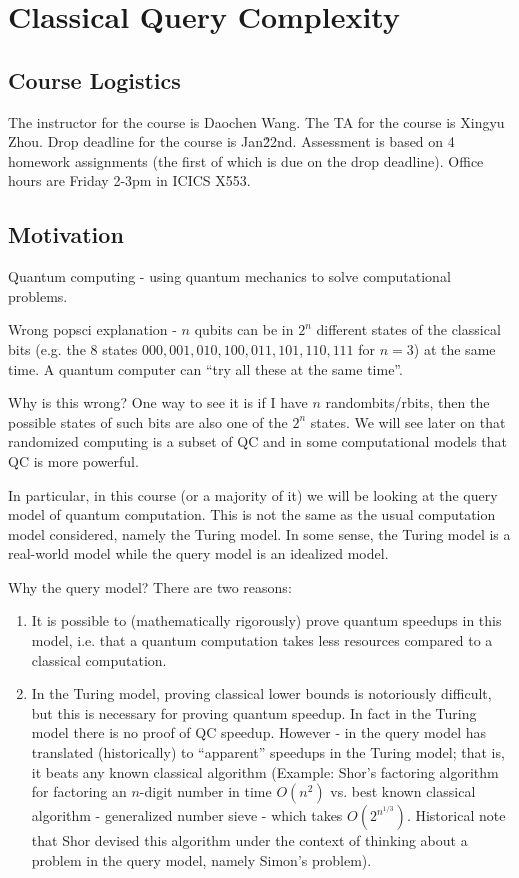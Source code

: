 \section{Classical Query Complexity}

\subsection*{Course Logistics}
The instructor for the course is Daochen Wang. The TA for the course is Xingyu Zhou. Drop deadline for the course is Jan\. 22nd. Assessment is based on 4 homework assignments (the first of which is due on the drop deadline). Office hours are Friday 2-3pm in ICICS X553. 

\subsection*{Motivation}
Quantum computing - using quantum mechanics to solve computational problems.

Wrong popsci explanation - $n$ qubits can be in $2^n$ different states of the classical bits (e.g. the 8 states $000, 001, 010, 100, 011, 101, 110, 111$ for $n = 3$) at the same time. A quantum computer can ``try all these at the same time''. 

Why is this wrong? One way to see it is if I have $n$ randombits/rbits, then the possible states of such bits are also one of the $2^n$ states. We will see later on that randomized computing is a subset of QC and in some computational models that QC is more powerful. 

In particular, in this course (or a majority of it) we will be looking at the query model of quantum computation. This is not the same as the usual computation model considered, namely the Turing model. In some sense, the Turing model is a real-world model while the query model is an idealized model.

Why the query model? There are two reasons:
\begin{enumerate}
    \item It is possible to (mathematically rigorously) prove quantum speedups in this model, i.e. that a quantum computation takes less resources compared to a classical computation.
    \item In the Turing model, proving classical lower bounds is notoriously difficult, but this is necessary for proving quantum speedup. In fact in the Turing model there is no proof of QC speedup. However - in the query model has translated (historically) to ``apparent'' speedups in the Turing model; that is, it beats any known classical algorithm (Example: Shor's factoring algorithm for factoring an $n$-digit number in time $O(n^2)$ vs. best known classical algorithm - generalized number sieve - which takes $O(2^{n^{1/3}})$. Historical note that Shor devised this algorithm under the context of thinking about a problem in the query model, namely Simon's problem).
\end{enumerate}

